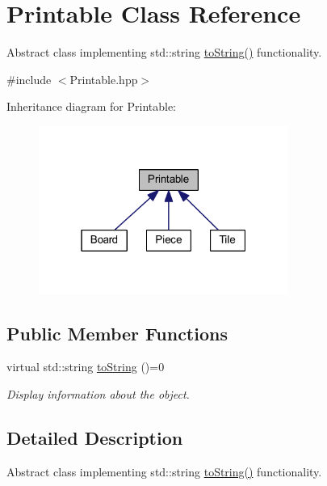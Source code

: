 \hypertarget{class_printable}{\section{Printable Class Reference}
\label{class_printable}
}


Abstract class implementing std\-::string \hyperlink{class_printable_a489f74384330f76d048d1ccf5c541571}{to\-String()} functionality.  




{\ttfamily \#include $<$Printable.\-hpp$>$}



Inheritance diagram for Printable\-:\nopagebreak
\begin{figure}[H]
\begin{center}
\leavevmode
\includegraphics[width=232pt]{class_printable__inherit__graph}
\end{center}
\end{figure}
\subsection*{Public Member Functions}
\begin{DoxyCompactItemize}
\item 
\hypertarget{class_printable_a489f74384330f76d048d1ccf5c541571}{virtual std\-::string \hyperlink{class_printable_a489f74384330f76d048d1ccf5c541571}{to\-String} ()=0}\label{class_printable_a489f74384330f76d048d1ccf5c541571}

\begin{DoxyCompactList}\small\item\em Display information about the object. \end{DoxyCompactList}\end{DoxyCompactItemize}


\subsection{Detailed Description}
Abstract class implementing std\-::string \hyperlink{class_printable_a489f74384330f76d048d1ccf5c541571}{to\-String()} functionality. 

